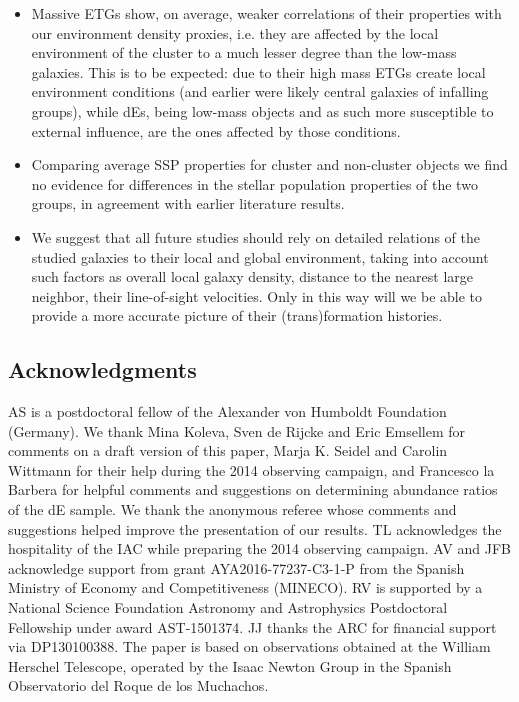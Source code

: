 \documentclass[useAMS,usenatbib]{mn2e}
\begin{document}
\begin{itemize}
\item Massive ETGs show, on average, weaker correlations of their properties with our environment density proxies, i.e. they are affected by the local environment of the cluster to a much lesser degree than the low-mass galaxies. This is to be expected: due to their high mass ETGs create local environment conditions (and earlier were likely central galaxies of infalling groups), while dEs, being low-mass objects and as such more susceptible to external influence, are the ones affected by those conditions.
\item Comparing average SSP properties for cluster and non-cluster objects we find no evidence for differences in the stellar population properties of the two groups, in agreement with earlier literature results. 
\item We suggest that all future studies should rely on detailed relations of the studied galaxies to their local and global environment, taking into account such factors as overall local galaxy density, distance to the nearest large neighbor, their line-of-sight velocities. Only in this way will we be able to provide a more accurate picture of their (trans)formation histories.
\end{itemize}

\begin{footnotesize}
\section*{Acknowledgments}

AS is a postdoctoral fellow of the Alexander von Humboldt Foundation (Germany). We thank Mina Koleva, Sven de Rijcke and Eric Emsellem for comments on a draft version of this paper, Marja K. Seidel and Carolin Wittmann for their help during the 2014 observing campaign, and Francesco la Barbera for helpful comments and suggestions on determining abundance ratios of the dE sample. We thank the anonymous referee whose comments and suggestions helped improve the presentation of our results. TL acknowledges the hospitality of the IAC while preparing the 2014 observing campaign. AV and JFB acknowledge support from grant AYA2016-77237-C3-1-P from the Spanish Ministry of Economy and Competitiveness (MINECO). RV is supported by a National Science Foundation Astronomy and Astrophysics Postdoctoral Fellowship under award AST-1501374. JJ thanks the ARC for financial support via DP130100388. The paper is based on observations obtained at the William Herschel Telescope, operated by the Isaac Newton Group in the Spanish Observatorio del Roque de los Muchachos.
\end{footnotesize}
\end{document}
